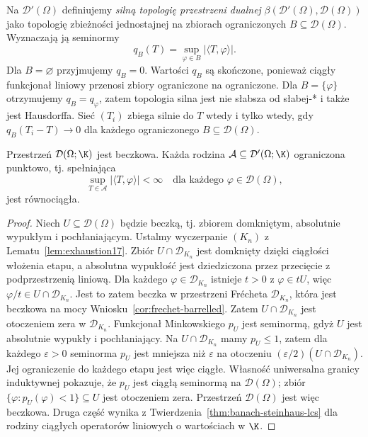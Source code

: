 \begin{definicja}
\label{def:strong19}
Na $\mathcal D'(\Omega)$ definiujemy
\emph{silną topologię przestrzeni dualnej}
$\beta(\mathcal D'(\Omega),\mathcal D(\Omega))$
jako topologię zbieżności jednostajnej na zbiorach
ograniczonych $B\subseteq\mathcal D(\Omega)$.
Wyznaczają ją seminormy
\[q_B(T)=\sup_{\varphi\in B}|\langle T,\varphi\rangle|.\]
Dla $B=\varnothing$ przyjmujemy $q_B=0$.
Wartości $q_B$ są skończone, ponieważ ciągły funkcjonał
liniowy przenosi zbiory ograniczone na ograniczone.
Dla $B=\{\varphi\}$ otrzymujemy $q_B=q_\varphi$,
zatem topologia silna jest nie słabsza od słabej-*
i także jest Hausdorffa. Sieć $(T_i)$ zbiega silnie do $T$
wtedy i tylko wtedy, gdy $q_B(T_i-T)\to0$
dla każdego ograniczonego $B\subseteq\mathcal D(\Omega)$.
\end{definicja}

\begin{twierdzenie}
\label{thm:D-barrelled19}
Przestrzeń $\mathcal D(\Omega;\K)$ jest beczkowa.
Każda rodzina $\mathcal A\subseteq\mathcal D'(\Omega;\K)$
ograniczona punktowo, tj. spełniająca
\[\sup_{T\in\mathcal A}|\langle T,\varphi\rangle|<\infty
\quad\text{dla każdego }\varphi\in\mathcal D(\Omega),\]
jest równociągła.
\end{twierdzenie}
\begin{proof}
Niech $U\subseteq\mathcal D(\Omega)$ będzie
beczką, tj. zbiorem domkniętym, absolutnie wypukłym
i pochłaniającym. Ustalmy wyczerpanie $(K_n)$ z Lematu~\ref{lem:exhaustion17}.
Zbiór $U\cap\mathcal D_{K_n}$ jest domknięty dzięki ciągłości
włożenia etapu, a absolutna wypukłość jest dziedziczona
przez przecięcie z podprzestrzenią liniową. Dla każdego
$\varphi\in\mathcal D_{K_n}$ istnieje $t>0$ z $\varphi\in tU$,
więc $\varphi/t\in U\cap\mathcal D_{K_n}$.
Jest to zatem beczka w przestrzeni Frécheta $\mathcal D_{K_n}$,
która jest beczkowa na mocy Wniosku~\ref{cor:frechet-barrelled}. Zatem
$U\cap\mathcal D_{K_n}$ jest otoczeniem zera
w $\mathcal D_{K_n}$.
Funkcjonał Minkowskiego $p_U$ jest seminormą, gdyż $U$
jest absolutnie wypukły i pochłaniający.
Na $U\cap\mathcal D_{K_n}$ mamy $p_U\le1$, zatem dla
każdego $\varepsilon>0$ seminorma $p_U$ jest mniejsza niż
$\varepsilon$ na otoczeniu $(\varepsilon/2)(U\cap\mathcal D_{K_n})$.
Jej ograniczenie do każdego etapu jest więc ciągłe. Własność uniwersalna
granicy induktywnej pokazuje, że $p_U$ jest ciągłą
seminormą na $\mathcal D(\Omega)$; zbiór
$\{\varphi:p_U(\varphi)<1\}\subseteq U$ jest otoczeniem
zera. Przestrzeń $\mathcal D(\Omega)$ jest więc beczkowa.
Druga część wynika z Twierdzenia~\ref{thm:banach-steinhaus-lcs}
dla rodziny ciągłych operatorów liniowych o wartościach w $\K$.
\end{proof}

